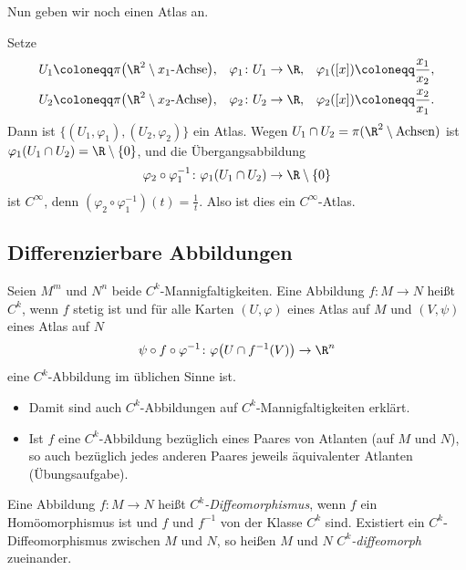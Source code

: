 \documentclass[11pt]{article}
\begin{document}
Nun geben wir noch einen Atlas an.

\begin{example}
  Setze
  \begin{align*}
    U_1 &\coloneqq \pi\bigl(\R^2 \setminus x_1\text{-Achse}\bigr), & \varphi_1\colon U_1 &\to \R, & \varphi_1([x]) &\coloneqq \frac{x_1}{x_2}, \\
    U_2 &\coloneqq \pi\bigl(\R^2 \setminus x_2\text{-Achse}\bigr), & \varphi_2\colon U_2 &\to \R, & \varphi_2([x]) &\coloneqq \frac{x_2}{x_1}.
  \end{align*}
  Dann ist $\{(U_1, \varphi_1), (U_2, \varphi_2)\}$ ein Atlas. Wegen $U_1 \cap U_2 = \pi(\R^2 \setminus \text{Achsen})$ ist $\varphi_1(U_1 \cap U_2) = \R \setminus \{0\}$, und die Übergangsabbildung
  \[ \varphi_2 \circ \varphi_1^{-1}\colon \varphi_1(U_1 \cap U_2) \to \R \setminus \{0\} \]
  ist $C^\infty$, denn $(\varphi_2 \circ \varphi_1^{-1})(t) = \frac{1}{t}$. Also ist dies ein $C^\infty$-Atlas.
\end{example}


\subsection{Differenzierbare Abbildungen}

\begin{definition}\Theorem
  Seien $M^m$ und $N^n$ beide $C^k$-Mannigfaltigkeiten. Eine Abbildung $f\colon M \to N$ heißt \emph{$C^k$}, wenn $f$ stetig ist und für alle Karten $(U, \varphi)$ eines Atlas auf $M$ und $(V, \psi)$ eines Atlas auf $N$
  \[ \psi \circ f \circ \varphi^{-1}\colon \varphi\bigl(U \cap f^{-1}(V)\bigr) \to \R^n \]
  eine $C^k$-Abbildung im üblichen Sinne ist.
\end{definition}

\begin{note}
  \begin{itemize}
    \item Damit sind auch $C^k$-Abbildungen auf $C^k$-Mannigfaltigkeiten erklärt.
    \item Ist $f$ eine $C^k$-Abbildung bezüglich eines Paares von Atlanten (auf $M$ und $N$), so auch bezüglich jedes anderen Paares jeweils äquivalenter Atlanten (Übungsaufgabe).
  \end{itemize}
\end{note}


\begin{definition}[Diffeomorphie]\Theorem
  Eine Abbildung $f\colon M \to N$ heißt \emph{$C^k$-Diffeomorphismus}, wenn $f$ ein Homöomorphismus ist und $f$ und $f^{-1}$ von der Klasse $C^k$ sind. Existiert ein $C^k$-Diffeomorphismus zwischen $M$ und $N$, so heißen $M$ und $N$ \emph{$C^k$-diffeomorph} zueinander.
\end{definition}
\end{document}
